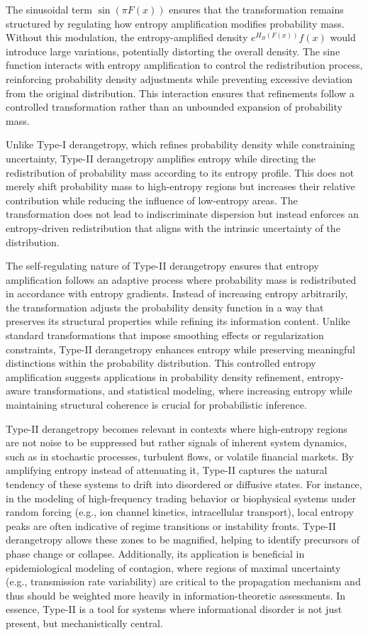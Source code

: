 \documentclass[sn-mathphys-num]{sn-jnl}%
\theoremstyle{thmstyleone}%
\theoremstyle{thmstyletwo}%
\theoremstyle{thmstylethree}%
\begin{document}
The sinusoidal term $\sin (\pi F(x))$ ensures that the transformation remains structured by regulating how entropy amplification modifies probability mass. Without this modulation, the entropy-amplified density $e^{H_B(F(x))} f(x)$ would introduce large variations, potentially distorting the overall density. The sine function interacts with entropy amplification to control the redistribution process, reinforcing probability density adjustments while preventing excessive deviation from the original distribution. This interaction ensures that refinements follow a controlled transformation rather than an unbounded expansion of probability mass.

Unlike Type-I derangetropy, which refines probability density while constraining uncertainty, Type-II derangetropy amplifies entropy while directing the redistribution of probability mass according to its entropy profile. This does not merely shift probability mass to high-entropy regions but increases their relative contribution while reducing the influence of low-entropy areas. The transformation does not lead to indiscriminate dispersion but instead enforces an entropy-driven redistribution that aligns with the intrinsic uncertainty of the distribution.

The self-regulating nature of Type-II derangetropy ensures that entropy amplification follows an adaptive process where probability mass is redistributed in accordance with entropy gradients. Instead of increasing entropy arbitrarily, the transformation adjusts the probability density function in a way that preserves its structural properties while refining its information content. Unlike standard transformations that impose smoothing effects or regularization constraints, Type-II derangetropy enhances entropy while preserving meaningful distinctions within the probability distribution. This controlled entropy amplification suggests applications in probability density refinement, entropy-aware transformations, and statistical modeling, where increasing entropy while maintaining structural coherence is crucial for probabilistic inference.

Type-II derangetropy becomes relevant in contexts where high-entropy regions are not noise to be suppressed but rather signals of inherent system dynamics, such as in stochastic processes, turbulent flows, or volatile financial markets. By amplifying entropy instead of attenuating it, Type-II captures the natural tendency of these systems to drift into disordered or diffusive states. For instance, in the modeling of high-frequency trading behavior or biophysical systems under random forcing (e.g., ion channel kinetics, intracellular transport), local entropy peaks are often indicative of regime transitions or instability fronts. Type-II derangetropy allows these zones to be magnified, helping to identify precursors of phase change or collapse. Additionally, its application is beneficial in epidemiological modeling of contagion, where regions of maximal uncertainty (e.g., transmission rate variability) are critical to the propagation mechanism and thus should be weighted more heavily in information-theoretic assessments. In essence, Type-II is a tool for systems where informational disorder is not just present, but mechanistically central.
\end{document}
